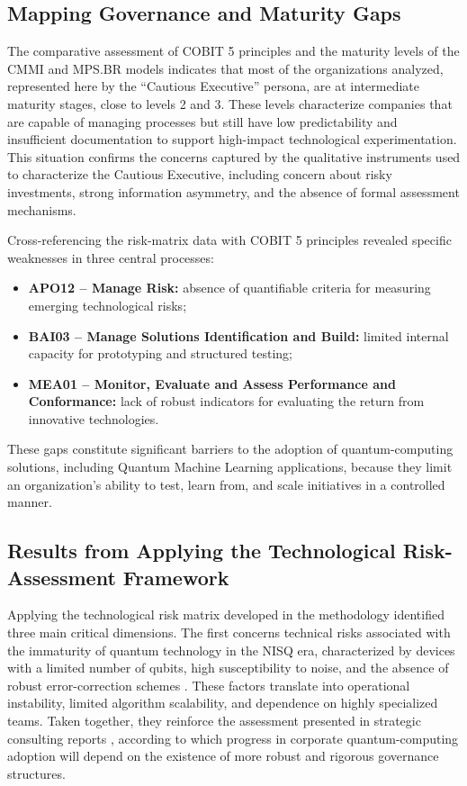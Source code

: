 \documentclass{icis}
\begin{document}
\subsection{Mapping Governance and Maturity Gaps}
The comparative assessment of COBIT 5 principles and the maturity levels of the CMMI and MPS.BR models indicates that most of the organizations analyzed, represented here by the ``Cautious Executive'' persona, are at intermediate maturity stages, close to levels 2 and 3. These levels characterize companies that are capable of managing processes but still have low predictability and insufficient documentation to support high-impact technological experimentation. This situation confirms the concerns captured by the qualitative instruments used to characterize the Cautious Executive, including concern about risky investments, strong information asymmetry, and the absence of formal assessment mechanisms.

Cross-referencing the risk-matrix data with COBIT 5 principles revealed specific weaknesses in three central processes:
\begin{itemize}[leftmargin=*]
    \item \textbf{APO12 -- Manage Risk:} absence of quantifiable criteria for measuring emerging technological risks;
    \item \textbf{BAI03 -- Manage Solutions Identification and Build:} limited internal capacity for prototyping and structured testing;
    \item \textbf{MEA01 -- Monitor, Evaluate and Assess Performance and Conformance:} lack of robust indicators for evaluating the return from innovative technologies.
\end{itemize}
These gaps constitute significant barriers to the adoption of quantum-computing solutions, including Quantum Machine Learning applications, because they limit an organization's ability to test, learn from, and scale initiatives in a controlled manner.

\subsection{Results from Applying the Technological Risk-Assessment Framework}
Applying the technological risk matrix developed in the methodology identified three main critical dimensions. The first concerns technical risks associated with the immaturity of quantum technology in the NISQ era, characterized by devices with a limited number of qubits, high susceptibility to noise, and the absence of robust error-correction schemes \parencite{preskill2018}. These factors translate into operational instability, limited algorithm scalability, and dependence on highly specialized teams. Taken together, they reinforce the assessment presented in strategic consulting reports \parencite{bcg2024,mckinsey2024}, according to which progress in corporate quantum-computing adoption will depend on the existence of more robust and rigorous governance structures.
\end{document}
